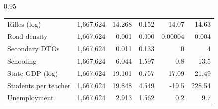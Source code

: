 \documentclass[12pt,letterpaper]{article}
\begin{document}
\begin{table}[h!]
\begin{spacing}{0.95}
\begin{tabular}{lrrrrr}
		Rifles (log)	&	 1,667,624 	&	14.268	&	0.152	&	14.07	&	14.63	 \\	
		Road density	&	 1,667,624 	&	0.001	&	0.000	&	0.00004	&	0.004	 \\
		Secondary DTOs	&	 1,667,624 	&	0.011	&	0.133	&	0	&	4	 \\	
		Schooling	&	 1,667,624 	&	6.044	&	1.597	&	0.8	&	13.5	 \\	
		State GDP (log)	&	 1,667,624 	&	19.101	&	0.757	&	17.09	&	21.49	 \\	
		Students per teacher	&	 1,667,624 	&	19.848	&	4.549	&	-19.5	&	228.54	 \\	
		Unemployment	&	 1,667,624 	&	2.913	&	1.562	&	0.2	&	9.7	 \\	\hline

\end{tabular}
\end{spacing}
\end{table}



\newpage
\end{document}
